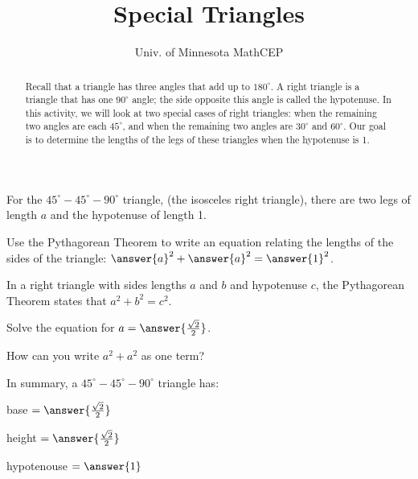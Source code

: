 \documentclass[number]{ximera}
\title{Special Triangles}
\author{Univ. of Minnesota MathCEP}
\begin{document}
\begin{abstract}
Recall that a triangle has three angles that add up to $180^\circ$.
A right triangle is a triangle that has one $90^\circ$ angle; the side opposite this angle is called the hypotenuse.
In this activity, we will look at two special cases of right triangles: when the remaining two angles are each $45^\circ$, and when the remaining two angles are $30^\circ$ and $60^\circ$.
Our goal is to determine the lengths of the legs of these triangles when the hypotenuse is 1.
\end{abstract}

\maketitle

For the $45^\circ-45^\circ-90^\circ$ triangle, (the isosceles right triangle), there are two legs of length $a$
and the hypotenuse of length 1.
\begin{image}
\end{image}


\begin{problem}
Use the Pythagorean Theorem to write an equation relating the lengths of the sides of the triangle: $\answer{a}^2+\answer{a}^2=\answer{1}^2$.
\begin{hint}
In a right triangle with sides lengths $a$ and $b$ and hypotenuse $c$, the Pythagorean Theorem states that $a^2+b^2=c^2$.
\end{hint}

\end{problem}

\begin{problem}
Solve the equation for $a = \answer{\frac{\sqrt{2}}{2}}$.
\begin{hint}
How can you write $a^2+a^2$ as one term?
\end{hint}
\end{problem}

\begin{problem}
In summary, a $45^\circ-45^\circ-90^\circ$ triangle has:

base $=\answer{\frac{\sqrt{2}}{2}}$

height $=\answer{\frac{\sqrt{2}}{2}}$

hypotenouse $=\answer{1}$
\end{problem}
\end{document}

